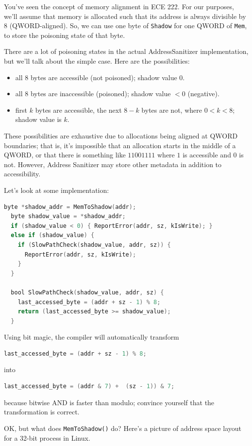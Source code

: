 \documentclass[11pt]{article}
\begin{document}
You've seen the concept of memory alignment in ECE 222. For our purposes,
we'll assume that memory is allocated such that its address is always
divisible by 8 (QWORD-aligned). So, we can use one byte of \texttt{Shadow}
for one QWORD of \texttt{Mem}, to store the poisoning state of that byte.

There are a lot of poisoning states in the actual AddressSanitizer
implementation, but we'll talk about the simple case. Here are
the possibilities:
\begin{itemize}[noitemsep]
\item all 8 bytes are accessible (not poisoned); shadow value 0.
\item all 8 bytes are inaccessible (poisoned); shadow value $< 0$ (negative).
\item first $k$ bytes are accessible, the next $8-k$ bytes are not, where $0 < k < 8$; shadow value is $k$.
\end{itemize}
These possibilities are exhaustive due to allocations being aligned at
QWORD boundaries; that is, it's impossible that an allocation starts in the middle of a QWORD, or that there is something like $11001111$ where $1$ is accessible and $0$ is not. However, Address Sanitizer may store other metadata in addition to accessibility.

Let's look at some implementation:
\begin{lstlisting}[language=C]
  byte *shadow_addr = MemToShadow(addr);
  byte shadow_value = *shadow_addr;
  if (shadow_value < 0) { ReportError(addr, sz, kIsWrite); }
  else if (shadow_value) {
    if (SlowPathCheck(shadow_value, addr, sz)) {
      ReportError(addr, sz, kIsWrite);
    }
  }

  bool SlowPathCheck(shadow_value, addr, sz) {
    last_accessed_byte = (addr + sz - 1) % 8;
    return (last_accessed_byte >= shadow_value);
  }
\end{lstlisting}
Using bit magic, the compiler will automatically transform
\begin{lstlisting}[language=C,numbers=none]
      last_accessed_byte = (addr + sz - 1) % 8;
\end{lstlisting}
into
\begin{lstlisting}[language=C,numbers=none]
      last_accessed_byte = (addr & 7) +  (sz - 1)) & 7;
\end{lstlisting}
because bitwise AND is faster than modulo; convince yourself that
the transformation is correct.

OK, but what does \texttt{MemToShadow()} do? Here's a picture of
address space layout for a 32-bit process in Linux.
\end{document}
